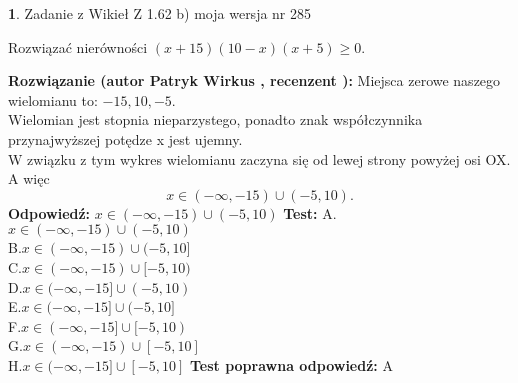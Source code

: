 \documentclass[12pt, a4paper]{article}
\theoremstyle{definition} %
\newtheorem{zad}{}
\newcommand{\zadStart}[1]{\begin{zad}#1\newline}
\newcommand{\zadStop}{\end{zad}}
\newcommand{\rozwStart}[2]{\noindent \textbf{Rozwiązanie (autor #1 , recenzent #2): }\newline}
\newcommand{\rozwStop}{\newline}
\newcommand{\odpStart}{\noindent \textbf{Odpowiedź:}\newline}
\newcommand{\odpStop}{\newline}
\newcommand{\testStart}{\noindent \textbf{Test:}\newline}
\newcommand{\testStop}{\newline}
\newcommand{\kluczStart}{\noindent \textbf{Test poprawna odpowiedź:}\newline}
\newcommand{\kluczStop}{\newline}
\begin{document}
\zadStart{Zadanie z Wikieł Z 1.62 b) moja wersja nr 285}

Rozwiązać nierówności $(x+15)(10-x)(x+5)\ge0$.
\zadStop
\rozwStart{Patryk Wirkus}{}
Miejsca zerowe naszego wielomianu to: $-15, 10, -5$.\\
Wielomian jest stopnia nieparzystego, ponadto znak współczynnika przy\linebreak najwyższej potędze x jest ujemny.\\ W związku z tym wykres wielomianu zaczyna się od lewej strony powyżej osi OX. A więc $$x \in (-\infty,-15) \cup (-5,10).$$
\rozwStop
\odpStart
$x \in (-\infty,-15) \cup (-5,10)$
\odpStop
\testStart
A.$x \in (-\infty,-15) \cup (-5,10)$\\
B.$x \in (-\infty,-15) \cup (-5,10]$\\
C.$x \in (-\infty,-15) \cup [-5,10)$\\
D.$x \in (-\infty,-15] \cup (-5,10)$\\
E.$x \in (-\infty,-15] \cup (-5,10]$\\
F.$x \in (-\infty,-15] \cup [-5,10)$\\
G.$x \in (-\infty,-15) \cup [-5,10]$\\
H.$x \in (-\infty,-15] \cup [-5,10]$
\testStop
\kluczStart
A
\kluczStop
\end{document}
